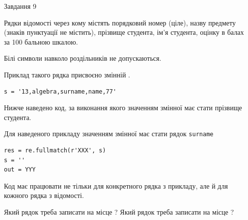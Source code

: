 \documentclass[12pt, ukrainian]{article}
\def\code#1{\Verb!#1!}
\begin{document}
{\begin{minipage}[t]{8.0cm}
\end{minipage}

               
{\begin{center}Завдання {9}\end{center}}
\vspace{-4mm}
Рядки відомості через кому містять порядковий номер (ціле), назву предмету (зна\-ків пунктуації не містить), прізвище студента, ім'я студента, оцінку в балах за 100 бальною шкалою.

Білі символи навколо роздільників не допускаються.

Приклад такого рядка присвоєно змінній .



\begin{verbatim}
s = '13,algebra,surname,name,77'
\end{verbatim}


Нижче наведено код, за виконання якого значенням змінної  має стати прізвище студента.

Для наведеного прикладу значенням змінної  має стати рядок \code{surname}



\begin{verbatim}
res = re.fullmatch(r'XXX', s)
s = ''
out = YYY
\end{verbatim}


Код має працювати не тільки для конкретного рядка з прикладу, але й для кожного рядка з відомості.


Який рядок треба записати на місце  ?
Який рядок треба записати на місце  ?\par

}
\newpage
\end{document}
